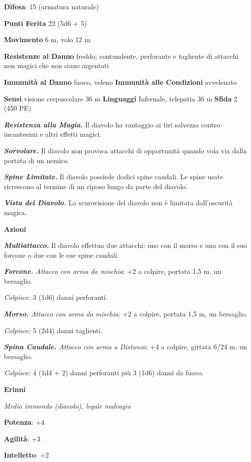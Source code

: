 \begin{multicols}{2}
\textbf{Difesa}: 15 (armatura naturale)

\textbf{Punti Ferita} 22 (5d6 + 5)

\textbf{Movimento} 6 m, volo 12 m

\textbf{Resistenze al Danno} freddo; contundente, perforante e tagliente
di attacchi non magici che non siano argentati

\textbf{Immunità al Danno} fuoco, veleno \textbf{Immunità alle
Condizioni} avvelenato

\textbf{Sensi} visione crepuscolare 36 m
\textbf{Linguaggi} Infernale, telepatia 36 m \textbf{Sfida} 2 (450 PE)

\emph{\textbf{Resistenza alla Magia.}} Il diavolo ha vantaggio ai tiri
salvezza contro incantesimi e altri effetti magici.

\emph{\textbf{Sorvolare.}} Il diavolo non provoca attacchi di
opportunità quando vola via dalla portata di un nemico.

\emph{\textbf{Spine Limitate.}} Il diavolo possiede dodici spine
caudali. Le spine usate ricrescono al termine di un riposo lungo da
parte del diavolo.

\emph{\textbf{Vista del Diavolo.}} La scurovisione del diavolo non è
limitata dall'oscurità magica.

\textbf{Azioni}

\emph{\textbf{Multiattacco.}} Il diavolo effettua due attacchi: uno con
il morso e uno con il suo forcone o due con le sue spine caudali.

\emph{\textbf{Forcone.} Attacco con arma da mischia}: +2 a colpire,
portata 1,5 m, un bersaglio.

\emph{Colpisce:} 3 (1d6) danni perforanti.

\emph{\textbf{Morso.} Attacco con arma da mischia}: +2 a colpire,
portata 1,5 m, un bersaglio.

\emph{Colpisce:} 5 (2d4) danni taglienti.

\emph{\textbf{Spina Caudale.} Attacco con arma a Distanza}: +4 a
colpire, gittata 6/24 m, un bersaglio.

\emph{Colpisce:} 4 (1d4 + 2) danni perforanti più 3 (1d6) danni da
fuoco.

\textbf{Erinni}

\emph{Media immondo (diavolo), legale malvagio}

\textbf{Potenza}: +4

\textbf{Agilità}: +3

\textbf{Intelletto}: +2


\end{multicols}
